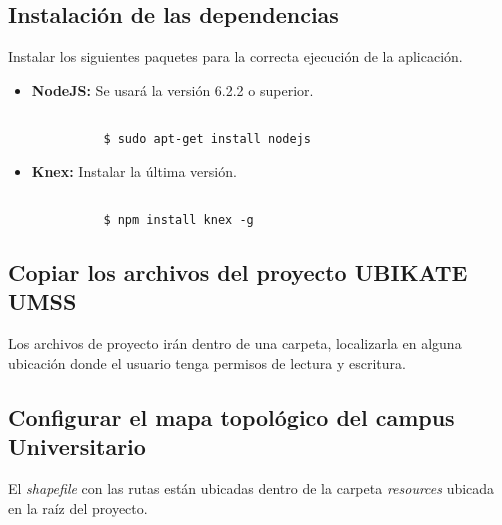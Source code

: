 \subsection{Instalación de las dependencias}

Instalar los siguientes paquetes para la correcta ejecución de la aplicación.

\begin{itemize}
  \item \textbf{NodeJS:} Se usará la versión 6.2.2 o superior.
  \begin{center}
    \begin{lstlisting}[label=node_install,caption=Comando para instalar NodeJS.]

          $ sudo apt-get install nodejs
    \end{lstlisting}
  \end{center}


  \item \textbf{Knex:} Instalar la última versión.
  \begin{center}
    \begin{lstlisting}[label=knex_install,caption=Commando para instalar Knex.]

          $ npm install knex -g
    \end{lstlisting}
  \end{center}

\end{itemize}


\subsection{Copiar los archivos del proyecto UBIKATE UMSS}

Los archivos de proyecto irán dentro de una carpeta, localizarla en alguna ubicación donde el usuario tenga permisos de lectura y escritura.

\subsection{Configurar el mapa topológico del campus Universitario}

El \emph{shapefile} con las rutas están ubicadas dentro de la carpeta \emph{resources} ubicada en la raíz del proyecto.

